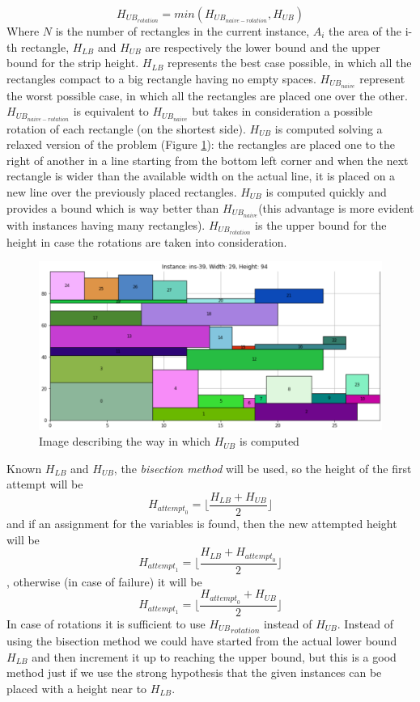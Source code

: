 $$H_{{UB}_{rotation}} = min(H_{{UB}_{naive-rotation}}, H_{UB})$$
\noindent
Where $N$ is the number of rectangles in the current instance, $A_i$ the area of the i-th rectangle, $H_{LB}$ and $H_{UB}$ are respectively the lower bound and the upper bound for the strip height. 
\noindent
$H_{LB}$ represents the best case possible, in which all the rectangles compact to a big rectangle having no empty spaces.
\noindent
$H_{{UB}_{naive}}$ represent the worst possible case, in which all the rectangles are placed one over the other.
\noindent
$H_{{UB}_{naive-rotation}}$ is equivalent to $H_{{UB}_{naive}}$ but takes in consideration a possible rotation of each rectangle (on the shortest side).
\noindent
$H_{UB}$ is computed solving a relaxed version of the problem (Figure \ref{img:H_UB}): the rectangles are placed one to the right of another in a line starting from the bottom left corner and when the next rectangle is wider than the available width on the actual line, it is placed on a new line over the previously placed rectangles. $H_{UB}$ is computed quickly and provides a bound which is way better than $H_{{UB}_{naive}}$(this advantage is more evident with instances having many rectangles).
\noindent
$H_{{UB}_{rotation}}$ is the upper bound for the height in case the rotations are taken into consideration.
\begin{figure}
  \centering
  \includegraphics[scale=0.6]{figures/H_UB.png}
  \caption{Image describing the way in which $H_{UB}$ is computed}
  \label{img:H_UB}
\end{figure}
\noindent
Known $H_{LB}$ and $H_{UB}$, the \textit{bisection method} will be used, so the height of the first attempt will be $$H_{{attempt}_{0}} = \lfloor \frac{H_{LB} + H_{UB}}{2} \rfloor$$ and if an assignment for the variables is found, then the new attempted height will be $$H_{{attempt}_{1}} = \lfloor \frac{H_{LB} + H_{{attempt}_{0}}}{2} \rfloor$$, otherwise (in case of failure) it will be $$H_{{attempt}_{1}} = \lfloor \frac{H_{{attempt}_{0}} + H_{UB}}{2} \rfloor$$
In case of rotations it is sufficient to use ${H_{UB}}_{rotation}$ instead of $H_{UB}$.
\newline
Instead of using the bisection method we could have started from the actual lower bound $H_{LB}$ and then increment it up to reaching the upper bound, but this is a good method just if we use the strong hypothesis that the given instances can be placed with a height near to $H_{LB}$.

